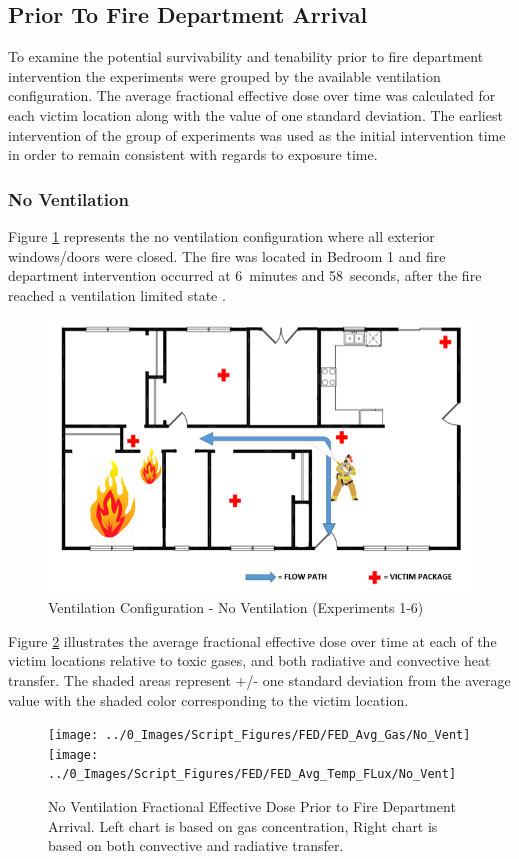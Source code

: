 \documentclass[12pt,oneside]{book}
\begin{document}
\subsection{Prior To Fire Department Arrival}
To examine the potential survivability and tenability prior to fire department intervention the experiments were grouped by the available ventilation configuration. The average fractional effective dose over time was calculated for each victim location along with the value of one standard deviation. The earliest intervention of the group of experiments was used as the initial intervention time in order to remain consistent with regards to exposure time.

\subsubsection{No Ventilation}

Figure \ref{fig:Vent_Profile-No_Vent} represents the no ventilation configuration where all exterior windows/doors were closed. The fire was located in Bedroom 1 and fire department intervention occurred at 6~minutes and 58~seconds, after the fire reached a ventilation limited state . 

\begin{figure}[H]
	\centering
	\includegraphics[width=.65\textwidth]{../0_Images/Ventilation_Configurations/No_Vent.png}
	\caption{Ventilation Configuration - No Ventilation (Experiments 1-6)}
	\label{fig:Vent_Profile-No_Vent}
\end{figure}

 Figure \ref{fig:FED_NoVent} illustrates the average fractional effective dose over time at each of the victim locations relative to toxic gases, and both radiative and convective heat transfer. The shaded areas represent +/- one standard deviation from the average value with the shaded color corresponding to the victim location. 

\begin{figure}[H]
	\centering
	\texttt{[image: ../0\_Images/Script\_Figures/FED/FED\_Avg\_Gas/No\_Vent]}
	\texttt{[image: ../0\_Images/Script\_Figures/FED/FED\_Avg\_Temp\_FLux/No\_Vent]}
	\caption[No Vent Fractional Effective Dose]{No Ventilation Fractional Effective Dose Prior to Fire Department Arrival. Left chart is based on gas concentration, Right chart is based on both convective and radiative transfer.}
	\label{fig:FED_NoVent}
\end{figure}
\end{document}
